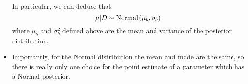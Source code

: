 \begin{itemize}
\begin{example}
\begin{equation*}
\end{equation*}
In particular, we can deduce that 
\begin{equation*}
\mu|D \sim {\rm Normal}\left( \mu_b,\sigma_b \right)
\end{equation*}
where $\mu_b$ and $\sigma_b^2$ defined above are the mean and variance of the posterior distribution. 
%


\end{example}

\item Importantly, for the Normal distribution the mean and mode are the same, so there is really only one choice for the point estimate of a parameter which has a Normal posterior. 

\end{itemize}


